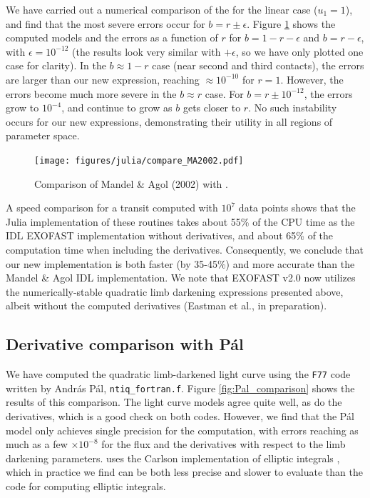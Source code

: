 \documentclass[modern]{aastex61}
\begin{document}
We have carried out a numerical comparison of the \citet{MandelAgol2002}
for the linear case ($u_1=1$), and find that the most severe errors
occur for $b = r \pm \epsilon$.  Figure \ref{fig:compareMA} shows
the computed models and the errors as a function of $r$ for $b=1-r-\epsilon$
and $b=r-\epsilon$, with $\epsilon = 10^{-12}$ (the results look very
similar with $+\epsilon$, so we have only plotted one case for clarity).
In the $b\approx 1-r$ case (near second and third contacts), the errors
are larger than our new expression, reaching $\approx 10^{-10}$ for
$r = 1$.  However, the errors become much more severe in the $b \approx r$
case.  For $b=r \pm 10^{-12}$, the errors grow to $10^{-4}$, and continue
to grow as $b$ gets closer to $r$.  No such instability occurs for
our new expressions, demonstrating their utility in all regions of
parameter space.

\begin{figure}
    \begin{centering}
    \texttt{[image: figures/julia/compare\_MA2002.pdf]}
    \caption{Comparison of Mandel \& Agol (2002) with \thiswork.
    \label{fig:compareMA}}
    \end{centering}
\end{figure}

A speed comparison for a transit computed with $10^7$ data points shows that
the Julia implementation of these routines takes about 55\% of the CPU
time as the IDL EXOFAST implementation without derivatives, and about 65\%
of the computation time when including the derivatives.  Consequently, we
conclude that our new implementation is both faster (by 35-45\%) and more 
accurate than the Mandel \& Agol IDL implementation.  We note that EXOFAST
v2.0 now utilizes the numerically-stable quadratic limb darkening expressions
presented above, albeit without the computed derivatives (Eastman et al.,
in preparation).

\subsection{Derivative comparison with P\'al}

We have computed the quadratic limb-darkened light curve using the \texttt{F77}
code written by Andr\'as P\'al, \texttt{ntiq\_fortran.f}.
Figure \ref{fig:Pal_comparison} shows the results of this comparison.
The light curve models agree quite well, as do the derivatives, which is
a good check on both codes.  However, we find that the P\'al model only
achieves single precision for the computation, with errors reaching as
much as a few $\times 10^{-8}$ for the flux and the derivatives with
respect to the limb darkening parameters.  \citet{Pal2008} uses the
Carlson implementation of elliptic integrals \citep{Carlson1979},
which in practice we find can be both less precise and slower to
evaluate than the \citet{Bulirsch1965a} code for computing elliptic
integrals.
\end{document}
